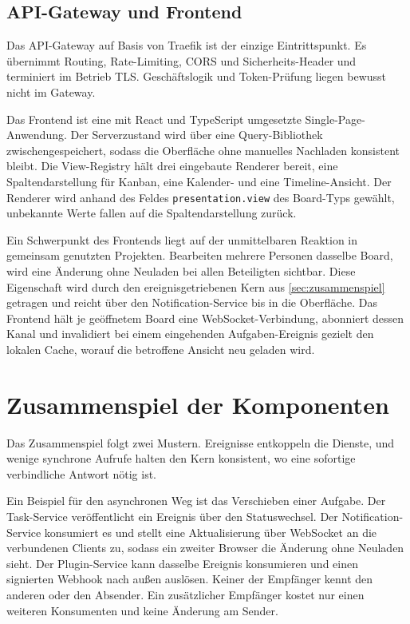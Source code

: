 \subsection{API-Gateway und Frontend}
\label{sub:gateway-frontend}

Das API-Gateway auf Basis von Traefik ist der einzige Eintrittspunkt. Es übernimmt Routing, Rate-Limiting, CORS und Sicherheits-Header und terminiert im Betrieb TLS. Geschäftslogik und Token-Prüfung liegen bewusst nicht im Gateway.

Das Frontend ist eine mit React und TypeScript umgesetzte Single-Page-Anwendung. Der Serverzustand wird über eine Query-Bibliothek zwischengespeichert, sodass die Oberfläche ohne manuelles Nachladen konsistent bleibt. Die View-Registry hält drei eingebaute Renderer bereit, eine Spaltendarstellung für Kanban, eine Kalender- und eine Timeline-Ansicht. Der Renderer wird anhand des Feldes \texttt{presentation.view} des Board-Typs gewählt, unbekannte Werte fallen auf die Spaltendarstellung zurück.

Ein Schwerpunkt des Frontends liegt auf der unmittelbaren Reaktion in gemeinsam genutzten Projekten. Bearbeiten mehrere Personen dasselbe Board, wird eine Änderung ohne Neuladen bei allen Beteiligten sichtbar. Diese Eigenschaft wird durch den ereignisgetriebenen Kern aus \vref{sec:zusammenspiel} getragen und reicht über den Notification-Service bis in die Oberfläche. Das Frontend hält je geöffnetem Board eine WebSocket-Verbindung, abonniert dessen Kanal und invalidiert bei einem eingehenden Aufgaben-Ereignis gezielt den lokalen Cache, worauf die betroffene Ansicht neu geladen wird.

\section{Zusammenspiel der Komponenten}
\label{sec:zusammenspiel}

Das Zusammenspiel folgt zwei Mustern. Ereignisse entkoppeln die Dienste, und wenige synchrone Aufrufe halten den Kern konsistent, wo eine sofortige verbindliche Antwort nötig ist.

Ein Beispiel für den asynchronen Weg ist das Verschieben einer Aufgabe. Der Task-Service veröffentlicht ein Ereignis über den Statuswechsel. Der Notification-Service konsumiert es und stellt eine Aktualisierung über WebSocket an die verbundenen Clients zu, sodass ein zweiter Browser die Änderung ohne Neuladen sieht. Der Plugin-Service kann dasselbe Ereignis konsumieren und einen signierten Webhook nach außen auslösen. Keiner der Empfänger kennt den anderen oder den Absender. Ein zusätzlicher Empfänger kostet nur einen weiteren Konsumenten und keine Änderung am Sender.

